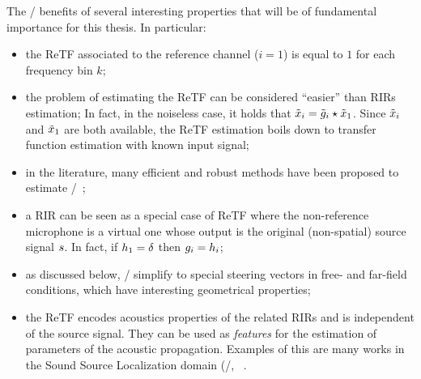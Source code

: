 \mynewline
The \ReTFs/ benefits of several interesting properties that will be of fundamental importance for this thesis.
In particular:
\begin{itemize}
    \item the \ac{ReTF} associated to the reference channel ($i = 1$) is equal to $1$ for each frequency bin $k$;
    \item the problem of estimating the \ac{ReTF} can be considered ``easier'' than \acp{RIR} estimation;
    In fact, in the noiseless case, it holds that $\tilde{x}_i = \tilde{g}_i \star \tilde{x}_1$.
    Since $\tilde{x}_i$ and $\tilde{x}_1$ are both available, the \ac{ReTF} estimation boils down to transfer function estimation with known input signal;
    \item in the literature, many efficient and robust methods have been proposed to estimate \ReTFs/~;
    \item a \ac{RIR} can be seen as a special case of \ac{ReTF} where the non-reference microphone is a virtual one whose
    output is the original (non-spatial) source signal $s$. In fact, if $h_1 = \delta$ then $g_i = h_i$;
    \item as discussed below, \ReTFs/ simplify to special steering vectors in free- and far-field conditions, which have interesting geometrical properties;
    \item the \ac{ReTF} encodes acoustics properties of the related \acp{RIR} and is independent of the source signal.
    They can be used as \textit{features} for the estimation of parameters of the acoustic propagation.
    Examples of this are many works in the Sound Source Localization domain (\eg/, ~.
\end{itemize}

